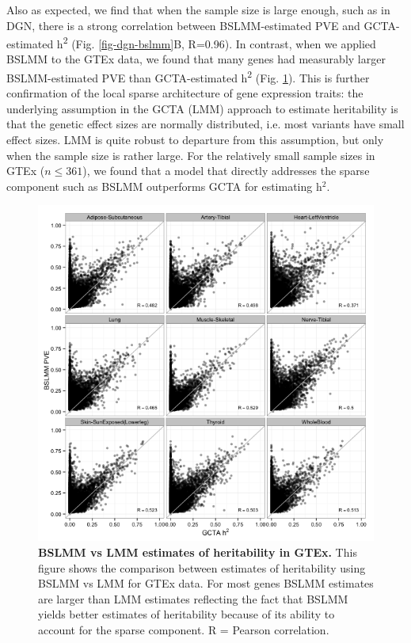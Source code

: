 \documentclass[10pt,letterpaper]{article}
\begin{document}
Also as expected, we find that when the sample size is large enough, such as in DGN, there is a strong correlation between BSLMM-estimated PVE and GCTA-estimated h\textsuperscript{2} (Fig. \ref{fig-dgn-bslmm}B, R=0.96). In contrast, when we applied BSLMM to the GTEx data, we found that many genes had measurably larger BSLMM-estimated PVE than GCTA-estimated h\textsuperscript{2} (Fig. \ref{fig-gtex-pve-h2}). This is further confirmation of the local sparse architecture of gene expression traits: the underlying assumption in the GCTA (LMM) approach to estimate heritability is that the genetic effect sizes are normally distributed, i.e. most variants have small effect sizes. LMM is quite robust to departure from this assumption, but only when the sample size is rather large. For the relatively small sample sizes in GTEx (\(n \leq 361\)), we found that a model that directly addresses the sparse component such as BSLMM outperforms GCTA for estimating h$^2$.

\begin{figure}[H]
\includegraphics[width=12cm]{Figures/Fig-GTEx_TW_PVE_v_h2.png}
\caption{{\bf BSLMM vs LMM estimates of heritability in GTEx.} 
This figure shows the comparison between estimates of heritability using BSLMM vs LMM for GTEx data. For most genes BSLMM estimates are larger than LMM estimates reflecting the fact that BSLMM yields better estimates of heritability because of its ability to account for the sparse component.
 R = Pearson correlation.}
\label{fig-gtex-pve-h2}
\end{figure}
\end{document}
